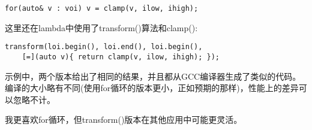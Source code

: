 \begin{lstlisting}[style=styleCXX]
for(auto& v : voi) v = clamp(v, ilow, ihigh);
\end{lstlisting}

这里还在lambda中使用了transform()算法和clamp():

\begin{lstlisting}[style=styleCXX]
transform(loi.begin(), loi.end(), loi.begin(),
	[=](auto v){ return clamp(v, ilow, ihigh); });
\end{lstlisting}

示例中，两个版本给出了相同的结果，并且都从GCC编译器生成了类似的代码。编译的大小略有不同(使用for循环的版本更小，正如预期的那样)，性能上的差异可以忽略不计。

我更喜欢for循环，但transform()版本在其他应用中可能更灵活。
